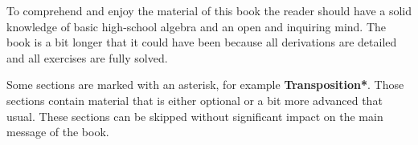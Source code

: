 To comprehend and enjoy the material of this book the reader should
have a solid knowledge of basic high-school algebra and an open and
inquiring mind. The book is a bit longer that it could have been
because all derivations are detailed and all exercises are fully
solved.

Some sections are marked with an asterisk, for example
{\bf Transposition*}. Those sections contain material that is either
optional or a bit more advanced that usual. These sections can be
skipped without significant impact on the main message of the book.
